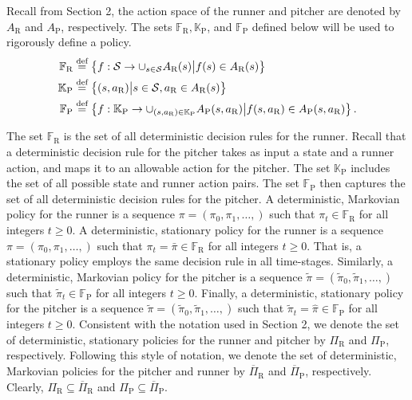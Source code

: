 \documentclass[aoas]{imsart}
\theoremstyle{plain}
\theoremstyle{definition}
\newcommand{\defeq}{\stackrel{\text{def}}{=}}
\begin{document}
    Recall from Section 2, the action space of the runner and pitcher are denoted by $A_{\text{R}}$ and $A_\text{P}$, respectively. The sets $\mathbb{F}_\text{R}, \mathbb{K}_\text{P}$, and $\mathbb{F}_\text{P}$ defined below will be used to rigorously define a policy. 
        \begingroup
        \allowdisplaybreaks
        \begin{align*}
            \mathbb{F}_\text{R} &\defeq \left\{f: {\cal S} \to \cup_{s \in {\cal S}}A_{\text{R}}(s) \big| f(s) \in A_{\text{R}}(s)\right\}\\
            \mathbb{K}_\text{P} &\defeq \left\{(s,a_\text{R})\big| s \in {\cal S}, a_\text{R} \in A_\text{R}(s)\right\}\\
            \mathbb{F}_\text{P} &\defeq \left\{f: \mathbb{K}_\text{P} \to \cup_{(s,a_\text{R}) \in \mathbb{K}_\text{P}} A_\text{P}(s,a_\text{R}) \big| f(s,a_\text{R}) \in A_\text{P}(s,a_\text{R})\right\}.
        \end{align*}
        \endgroup
    
       \noindent The set $\mathbb{F}_\text{R}$ is the set of all deterministic decision rules for the runner. Recall that a deterministic decision rule for the pitcher takes as input a state and a runner action, and maps it to an allowable action for the pitcher. The set $\mathbb{K}_\text{P}$ includes the set of all possible state and runner action pairs. The set $\mathbb{F}_\text{P}$ then captures the set of all deterministic decision rules for the pitcher. A deterministic, Markovian policy for the runner is a sequence $\pi = (\pi_0,\pi_1,\ldots,)$ such that $\pi_t \in \mathbb{F}_\text{R}$ for all integers $t \geq 0$. A deterministic, stationary policy for the runner is a sequence $\pi = (\pi_0,\pi_1,\ldots,)$ such that $\pi_t = \bar\pi \in \mathbb{F}_\text{R}$ for all integers $t \geq 0$. That is, a stationary policy employs the same decision rule in all time-stages. Similarly, a deterministic, Markovian policy for the pitcher is a sequence $\tilde\pi = (\tilde\pi_0,\tilde\pi_1,\ldots,)$ such that $\tilde\pi_t \in \mathbb{F}_\text{P}$ for all integers $t \geq 0$. Finally, a deterministic, stationary policy for the pitcher is a sequence $\tilde\pi = (\tilde\pi_0,\tilde\pi_1,\ldots,)$ such that $\tilde\pi_t = \hat\pi \in \mathbb{F}_\text{P}$ for all integers $t \geq 0$. Consistent with the notation used in Section 2, we denote the set of deterministic, stationary policies for the runner and pitcher by $\Pi_\text{R}$ and $\Pi_\text{P}$, respectively. Following this style of notation, we denote the set of deterministic, Markovian policies for the pitcher and runner by $\overline\Pi_\text{R}$ and $\overline\Pi_\text{P}$, respectively. Clearly, $\Pi_\text{R} \subseteq \overline\Pi_\text{R}$ and $\Pi_\text{P} \subseteq \overline\Pi_\text{P}$.
    
\end{document}
